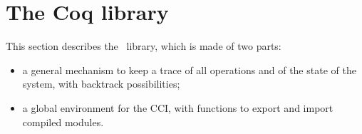 
\section*{The Coq library}

\ocwsection \label{library}
This section describes the \Coq\ library, which is made of two parts:
\begin{itemize}
  \item a general mechanism to keep a trace of all operations and of
    the state of the system, with backtrack possibilities;
  \item a global environment for the CCI, with functions to export and 
    import compiled modules.
\end{itemize}
